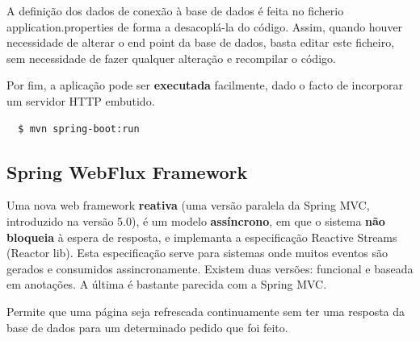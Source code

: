 \documentclass{article}
\begin{document}
A definição dos dados de conexão à base de dados é feita no ficherio application.properties de forma a desacoplá-la
do código. Assim, quando houver necessidade de alterar o end point da base de dados, basta editar este ficheiro, sem
necessidade de fazer qualquer alteração e recompilar o código.

\vspace{2mm}

Por fim, a aplicação pode ser \textbf{executada} facilmente, dado o facto de incorporar um servidor
HTTP embutido.

\begin{lstlisting}
  $ mvn spring-boot:run
\end{lstlisting}

\subsection{Spring WebFlux Framework}

Uma nova web framework \textbf{reativa} (uma versão paralela
da Spring MVC, introduzido na versão 5.0), é um modelo \textbf{assíncrono},
em que o sistema \textbf{não bloqueia} à espera de resposta, e implemanta
a especificação Reactive Streams (Reactor lib). Esta especificação
serve para sistemas onde muitos eventos são gerados e consumidos
assincronamente. Existem duas versões: funcional e baseada em anotações.
A última é bastante parecida com a Spring MVC.

Permite que uma página seja refrescada continuamente sem ter uma resposta da base de dados para um determinado
pedido que foi feito.
\end{document}
